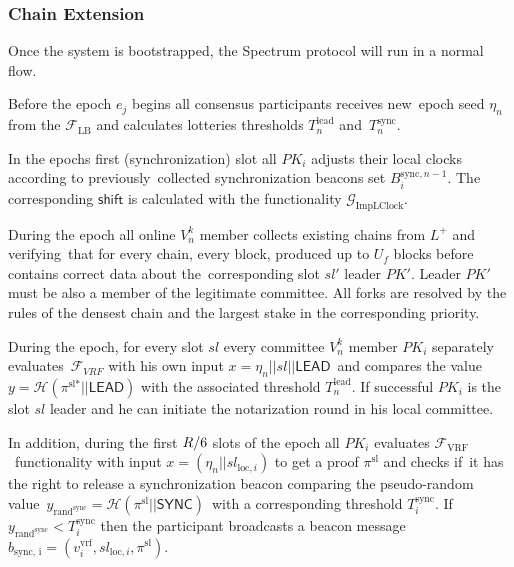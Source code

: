 \subsubsection{Chain Extension}\label{subsubsec:chain-extension}
Once the system is bootstrapped, the Spectrum protocol will run in a normal flow.

\begin{legal}

    \item Before the epoch $e_j$ begins all consensus participants receives new\
    epoch seed $\eta_n$ from the ${\mathcal{F}}_{\text{LB}}$ and calculates lotteries thresholds $T_n^{\text{lead}}$ and\
    $T_n^{\text{sync}}$.

    \item In the epochs first (synchronization) slot all $PK_i$ adjusts their local clocks according to previously\
    collected synchronization beacons set $B_i^{\text{sync}, n - 1}$.
    The corresponding $\textsf{shift}$ is calculated with the functionality $\mathcal{G}_{\text{ImpLClock}}$.

    \item During the epoch all online $V^k_n$ member collects existing chains from $L^+$ and verifying\
    that for every chain, every block, produced up to $U_f$ blocks before contains correct data about the\
    corresponding slot $sl'$ leader $PK'$.
    Leader $PK'$ must be also a member of the legitimate committee.
    All forks are resolved by the rules of the densest chain and the largest stake in the corresponding priority.

    \item During the epoch, for every slot $sl$ every committee $V^k_n$ member $PK_i$ separately evaluates\
    ${\mathcal{F}}_{VRF}$ with his own input ${x = \eta_n || sl || \textsf{LEAD}}$\ and compares the value
    ${y = \mathcal{H}(\pi^{\text{sl}*}||\textsf{LEAD})}$ with the associated threshold $T_n^{\text{lead}}$.
    If successful $PK_i$ is the slot $sl$ leader and he can initiate the notarization round in his local committee.

    In addition, during the first $R\//6$ slots of the epoch all $PK_i$ evaluates $\mathcal{F}_{\text{VRF}}$\
    functionality with input ${x = (\eta_n || sl_{\text{loc}, i})}$ to get a proof $\pi^{\text{sl}}$ and checks if\
    it has the right to release a synchronization beacon comparing the pseudo-random value\
    ${y_{\text{rand}^{\text{sync}}} = \mathcal{H}(\pi^{\text{sl}} || \textsf{SYNC})}$\
    with a corresponding threshold $T^{\text{sync}}_i$.
    If ${y_{\text{rand}^{\text{sync}}} < T^{\text{sync}}_i}$ then the participant broadcasts a beacon message\
    $b_{\text{sync, i}} = (v^{\text{vrf}}_i, sl_{\text{loc}, i}, \pi^{\text{sl}})$.


\end{legal}
